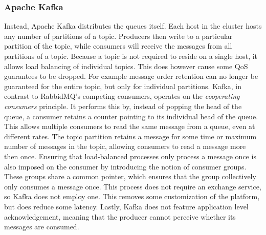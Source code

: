 \subsubsection*{Apache Kafka}
Instead, Apache Kafka \cite{web:kafka} distributes the queues itself. Each host in the cluster hosts any number of partitions of a topic. Producers then write to a particular partition of the topic, while consumers will receive the messages from all partitions of a topic. Because a topic is not required to reside on a single host, it allows load balancing of individual topics. This does however cause some QoS guarantees to be dropped. For example message order retention can no longer be guaranteed for the entire topic, but only for individual partitions. Kafka, in contrast to RabbidMQ's competing consumers, operates on the \emph{cooperating consumers} principle. It performs this by, instead of popping the head of the queue, a consumer retains a counter pointing to its individual head of the queue. This allows multiple consumers to read the same message from a queue, even at different rates. The topic partition retains a message for some time or maximum number of messages in the topic, allowing consumers to read a message more then once. Ensuring that load-balanced processes only process a message once is also imposed on the consumer by introducing the notion of consumer groups. These groups share a common pointer, which ensures that the group collectively only consumes a message once. This process does not require an exchange service, so Kafka does not employ one. This removes some customization of the platform, but does reduce some latency. Lastly, Kafka does not feature application level acknowledgement, meaning that the producer cannot perceive whether its messages are consumed.


